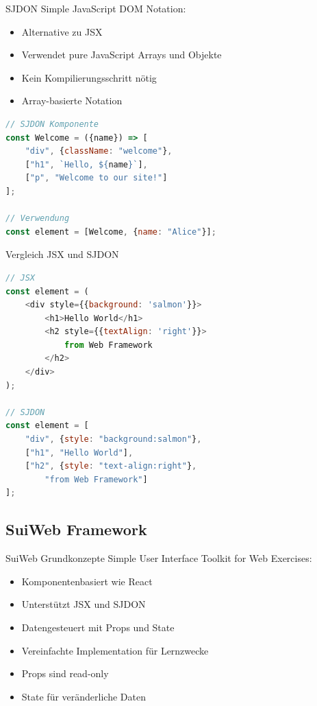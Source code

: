 \begin{definition}{SJDON}
    Simple JavaScript DOM Notation:
    \begin{itemize}
        \item Alternative zu JSX
        \item Verwendet pure JavaScript Arrays und Objekte
        \item Kein Kompilierungsschritt nötig
        \item Array-basierte Notation
    \end{itemize}
\begin{lstlisting}[language=JavaScript, style=basesmol]
// SJDON Komponente
const Welcome = ({name}) => [
    "div", {className: "welcome"},
    ["h1", `Hello, ${name}`],
    ["p", "Welcome to our site!"]
];

// Verwendung
const element = [Welcome, {name: "Alice"}];
\end{lstlisting}
\end{definition}

\begin{KR}{Vergleich JSX und SJDON}
\begin{lstlisting}[language=JavaScript, style=basesmol]
// JSX
const element = (
    <div style={{background: 'salmon'}}>
        <h1>Hello World</h1>
        <h2 style={{textAlign: 'right'}}>
            from Web Framework
        </h2>
    </div>
);

// SJDON
const element = [
    "div", {style: "background:salmon"},
    ["h1", "Hello World"],
    ["h2", {style: "text-align:right"}, 
        "from Web Framework"]
];
\end{lstlisting}
\end{KR}

\pagebreak

\subsection{SuiWeb Framework}

\begin{concept}{SuiWeb Grundkonzepte}
    Simple User Interface Toolkit for Web Exercises:
    \begin{itemize}
        \item Komponentenbasiert wie React
        \item Unterstützt JSX und SJDON
        \item Datengesteuert mit Props und State
        \item Vereinfachte Implementation für Lernzwecke
        \item Props sind read-only
        \item State für veränderliche Daten
    \end{itemize}
\end{concept}



